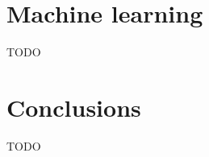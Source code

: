 \documentclass[sigconf]{acmart}
\begin{document}
    \section{Machine learning}
    TODO


    \section{Conclusions}
    TODO

    
    
\end{document}
